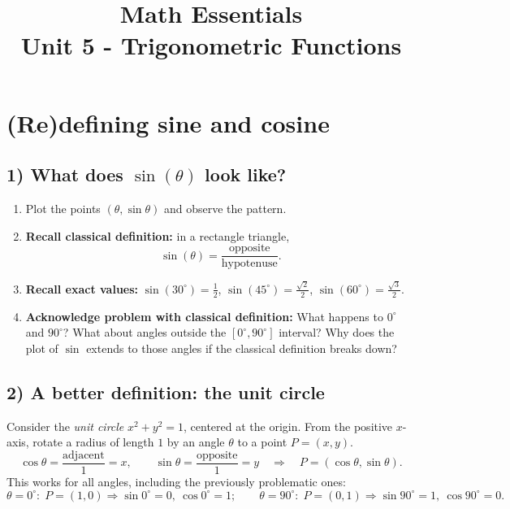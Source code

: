 \documentclass{article}
\title{Math Essentials \\ Unit 5 - Trigonometric Functions}
\author{}
\date{}
\begin{document}
\maketitle

\section*{(Re)defining sine and cosine}

\subsection*{1) What does \(\sin(\theta)\) look like?}
\begin{enumerate}[leftmargin=0.7cm,label=(\roman*)]
  \item Plot the points \((\theta,\sin\theta)\) and observe the pattern.
  \item \textbf{Recall classical definition:} in a rectangle triangle,
    \[
    \sin(\theta)=\frac{\text{opposite}}{\text{hypotenuse}}.
    \]
  \item \textbf{Recall exact values:}  \(\sin(30^\circ)=\tfrac12\), \(\sin(45^\circ)=\tfrac{\sqrt2}{2}\), \(\sin(60^\circ)=\tfrac{\sqrt3}{2}\).
  \item \textbf{Acknowledge problem with classical definition:}
  What happens to \(0^\circ\) and \(90^\circ\)? What about angles outside the $[0^\circ, 90^\circ]$ interval? Why does the plot of $\sin$ extends to those angles if the classical definition breaks down? 
\end{enumerate}

\subsection*{2) A better definition: the unit circle}
Consider the \emph{unit circle} \(x^2+y^2=1\), centered at the origin. From the positive \(x\)-axis, rotate a radius of length \(1\) by an angle \(\theta\) to a point \(P=(x,y)\).
\[
\cos\theta=\frac{\text{adjacent}}{1}=x,\qquad \sin\theta=\frac{\text{opposite}}{1}=y
\quad\Rightarrow\quad P=(\cos\theta,\sin\theta).
\]
This works for all angles, including the previously problematic ones:
\[
\theta=0^\circ:\;P=(1,0)\Rightarrow \sin0^\circ=0,\ \cos0^\circ=1;\qquad
\theta=90^\circ:\;P=(0,1)\Rightarrow \sin90^\circ=1,\ \cos90^\circ=0.
\]
\end{document}

